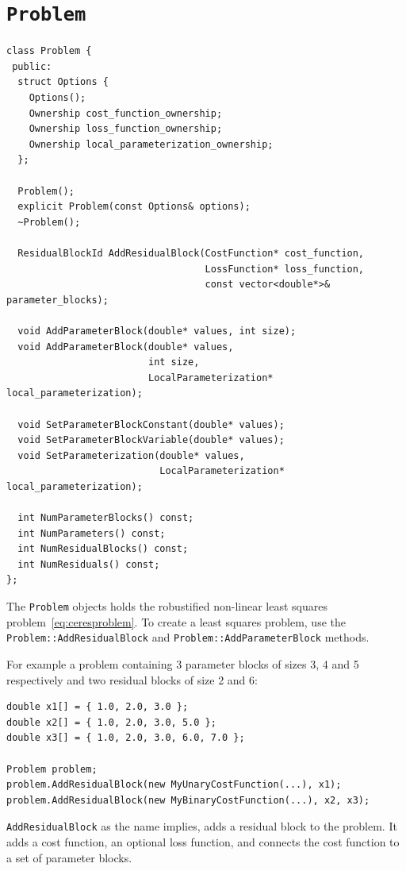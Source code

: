 \section{\texttt{Problem}}
\begin{verbatim}
class Problem {
 public:
  struct Options {
    Options();
    Ownership cost_function_ownership;
    Ownership loss_function_ownership;
    Ownership local_parameterization_ownership;
  };

  Problem();
  explicit Problem(const Options& options);
  ~Problem();

  ResidualBlockId AddResidualBlock(CostFunction* cost_function,
                                   LossFunction* loss_function,
                                   const vector<double*>& parameter_blocks);

  void AddParameterBlock(double* values, int size);
  void AddParameterBlock(double* values,
                         int size,
                         LocalParameterization* local_parameterization);

  void SetParameterBlockConstant(double* values);
  void SetParameterBlockVariable(double* values);
  void SetParameterization(double* values,
                           LocalParameterization* local_parameterization);

  int NumParameterBlocks() const;
  int NumParameters() const;
  int NumResidualBlocks() const;
  int NumResiduals() const;
};
\end{verbatim}

The \texttt{Problem} objects holds the robustified non-linear least squares problem~\eqref{eq:ceresproblem}. To create a least squares problem, use the \texttt{Problem::AddResidualBlock} and \texttt{Problem::AddParameterBlock} methods.

For example a problem containing 3 parameter blocks of sizes 3, 4 and 5
respectively and two residual blocks  of size 2 and 6:

\begin{verbatim}
double x1[] = { 1.0, 2.0, 3.0 };
double x2[] = { 1.0, 2.0, 3.0, 5.0 };
double x3[] = { 1.0, 2.0, 3.0, 6.0, 7.0 };

Problem problem;
problem.AddResidualBlock(new MyUnaryCostFunction(...), x1);
problem.AddResidualBlock(new MyBinaryCostFunction(...), x2, x3);
\end{verbatim}


\texttt{AddResidualBlock} as the name implies, adds a residual block to the problem. It adds a cost function, an optional loss function, and connects the cost function to a set of parameter blocks.

